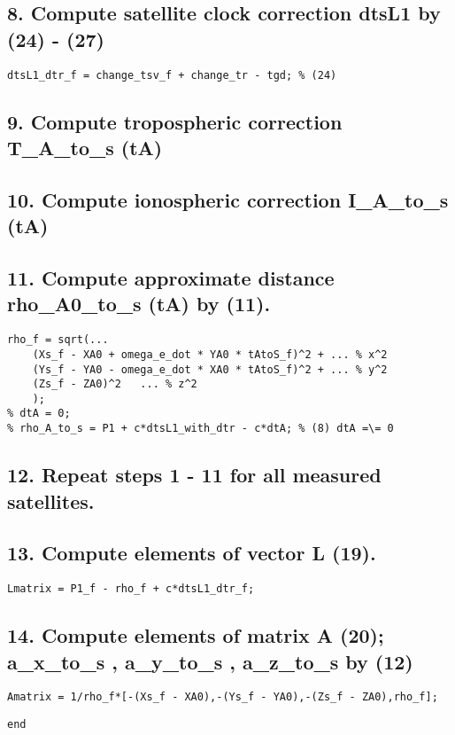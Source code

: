 \subsection*{8. Compute satellite clock correction dtsL1 by (24) - (27)}

\begin{verbatim}
dtsL1_dtr_f = change_tsv_f + change_tr - tgd; % (24)
\end{verbatim}


\subsection*{9. Compute tropospheric correction T\_A\_to\_s (tA)}



\subsection*{10. Compute ionospheric correction I\_A\_to\_s (tA)}



\subsection*{11. Compute approximate distance rho\_A0\_to\_s (tA) by (11).}

\begin{verbatim}
rho_f = sqrt(...
    (Xs_f - XA0 + omega_e_dot * YA0 * tAtoS_f)^2 + ... % x^2
    (Ys_f - YA0 - omega_e_dot * XA0 * tAtoS_f)^2 + ... % y^2
    (Zs_f - ZA0)^2   ... % z^2
    );
% dtA = 0;
% rho_A_to_s = P1 + c*dtsL1_with_dtr - c*dtA; % (8) dtA =\= 0
\end{verbatim}


\subsection*{12. Repeat steps 1 - 11 for all measured satellites.}



\subsection*{13. Compute elements of vector L (19).}

\begin{verbatim}
Lmatrix = P1_f - rho_f + c*dtsL1_dtr_f;
\end{verbatim}


\subsection*{14. Compute elements of matrix A (20); a\_x\_to\_s , a\_y\_to\_s , a\_z\_to\_s by (12)}

\begin{verbatim}
Amatrix = 1/rho_f*[-(Xs_f - XA0),-(Ys_f - YA0),-(Zs_f - ZA0),rho_f];
\end{verbatim}
\begin{verbatim}
end
\end{verbatim}

    
